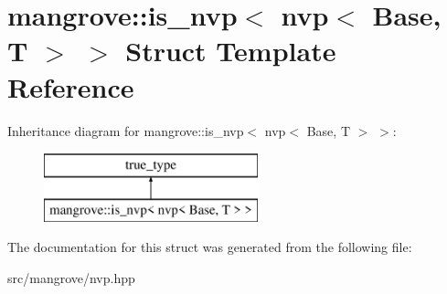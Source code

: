 \hypertarget{structmangrove_1_1is__nvp_3_01nvp_3_01Base_00_01T_01_4_01_4}{}\section{mangrove\+:\+:is\+\_\+nvp$<$ nvp$<$ Base, T $>$ $>$ Struct Template Reference}
\label{structmangrove_1_1is__nvp_3_01nvp_3_01Base_00_01T_01_4_01_4}
Inheritance diagram for mangrove\+:\+:is\+\_\+nvp$<$ nvp$<$ Base, T $>$ $>$\+:\begin{figure}[H]
\begin{center}
\leavevmode
\includegraphics[height=2.000000cm]{structmangrove_1_1is__nvp_3_01nvp_3_01Base_00_01T_01_4_01_4}
\end{center}
\end{figure}


The documentation for this struct was generated from the following file\+:\begin{DoxyCompactItemize}
\item 
src/mangrove/nvp.\+hpp\end{DoxyCompactItemize}
